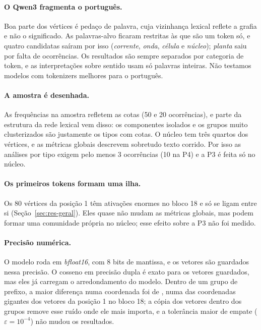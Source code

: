 \paragraph{O Qwen3 fragmenta o português.} Boa parte dos vértices é pedaço de palavra, cuja
vizinhança lexical reflete a grafia e não o significado. As palavras-alvo ficaram restritas às
que são um token só, e quatro candidatas saíram por isso (\emph{corrente}, \emph{onda},
\emph{célula} e \emph{núcleo}); \emph{planta} saiu por falta de ocorrências. Os resultados são
sempre separados por categoria de token, e as interpretações sobre sentido usam só palavras
inteiras. Não testamos modelos com tokenizers melhores para o português.

\paragraph{A amostra é desenhada.} As frequências na amostra refletem as cotas (50 e 20
ocorrências), e parte da estrutura da rede lexical vem disso: os componentes isolados e os
grupos muito clusterizados são justamente os tipos com cotas. O núcleo tem três quartos dos
vértices, e as métricas globais descrevem sobretudo texto corrido. Por isso as análises por
tipo exigem pelo menos 3 ocorrências (10 na P4) e a P3 é feita só no núcleo.

\paragraph{Os primeiros tokens formam uma ilha.} Os 80 vértices da posição 1 têm ativações
enormes no bloco 18 e só se ligam entre si (Seção~\ref{sec:res-geral}). Eles quase não mudam
as métricas globais, mas podem formar uma comunidade própria no núcleo; esse efeito sobre a P3
não foi medido.

\paragraph{Precisão numérica.} O modelo roda em \emph{bfloat16}, com 8 bits de mantissa, e os
vetores são guardados nessa precisão. O cosseno em precisão dupla é exato para os vetores
guardados, mas eles já carregam o arredondamento do modelo. Dentro de um grupo de prefixo, a
maior diferença numa coordenada foi de \difMaxPrefixo{}, numa das coordenadas gigantes dos
vetores da posição 1 no bloco 18; a cópia dos vetores dentro dos grupos remove esse ruído onde
ele mais importa, e a tolerância maior de empate ($\varepsilon=10^{-4}$) não mudou os
resultados.


